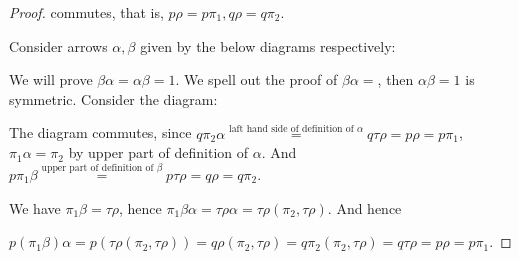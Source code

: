 \documentclass[a4paper]{article}
\begin{document}
\begin{proof}
    commutes, that is, $p\rho = p\pi_1,q\rho = q\pi_2$.

    Consider arrows $\alpha,\beta$ given by the below diagrams respectively:

    \begin{center}
    \end{center}

    \begin{center}
    \end{center}

    We will prove $\beta\alpha = \alpha\beta = 1$. We spell out the proof of $\beta\alpha =$, then $\alpha\beta = 1$ is symmetric. Consider the diagram:

    \begin{center}
    \end{center}

    The diagram commutes, since $q\pi_2\alpha \overset{\text{laft hand side of definition of $\alpha$}}= q\tau\rho = p\rho = p\pi_1$, $\pi_1\alpha = \pi_2$ by upper part of definition of $\alpha$. And $p\pi_1\beta\overset{\text{upper part of definition of $\beta$}}=p\tau\rho=q\rho = q\pi_2$.

    We have $\pi_1\beta = \tau\rho$, hence $\pi_1\beta\alpha = \tau\rho\alpha = \tau\rho(\pi_2,\tau\rho)$. And hence 

    $p(\pi_1\beta)\alpha = p(\tau\rho(\pi_2,\tau\rho))=q\rho(\pi_2,\tau\rho)=q\pi_2(\pi_2,\tau\rho)=q\tau\rho=p\rho=p\pi_1$.


\end{proof}
\end{document}
